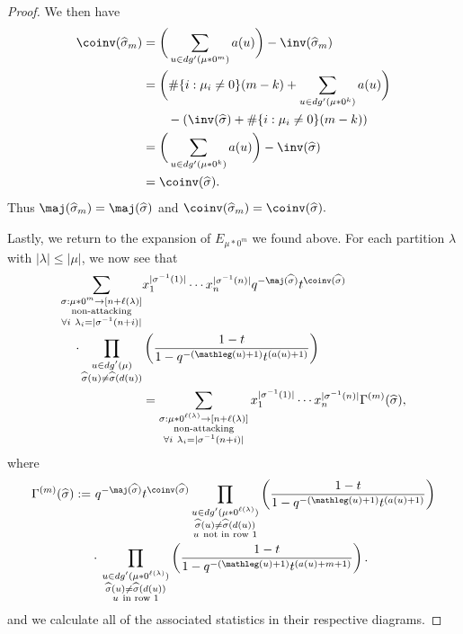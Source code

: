 \begin{proof}
We then have 
\begin{align*}
    \coinv(\widehat{\sigma}_m)&= \bigg( \sum_{u \in dg'(\mu * 0^m)} a(u) \bigg) - \inv(\widehat{\sigma}_m) \\
    &= \bigg(\#\{i:\mu_i \neq 0\}(m-k) + \sum_{u \in dg'(\mu*0^k)} a(u)\bigg) \\ & \qquad - \left( \inv(\widehat{\sigma}) + \#\{i:\mu_i \neq 0\}(m-k)\right)\\
    & = \bigg( \sum_{u \in dg'(\mu*0^k)} a(u)\bigg) - \inv(\widehat{\sigma}) \\
    &= \coinv(\widehat{\sigma}).
\end{align*}
  Thus $\maj(\widehat{\sigma}_m) = \maj(\widehat{\sigma})$ and $\coinv(\widehat{\sigma}_m)= \coinv(\widehat{\sigma}).$

Lastly, we return to the expansion of $E_{\mu*0^m}$ we found above. For each partition $\lambda$ with $|\lambda| \leq |\mu|$, we now see that 
\begin{align*}
     \sum_{\substack{\sigma:\mu* 0^m \rightarrow [n+\ell(\lambda)]\\ \text{non-attacking} \\ \forall i ~ \lambda_i = |\sigma^{-1}(n+i)|}} & x_1 ^{|\sigma^{-1}(1)|}\cdots x_n ^{|\sigma^{-1}(n)|} q^{-\maj(\widehat{\sigma})}t^{\coinv(\widehat{\sigma})} \\
      \cdot \prod_{\substack{u \in dg'(\mu) \\ \widehat{\sigma}(u) \neq \widehat{\sigma}(d(u))}} & \left( \frac{1-t}{1-q^{-(\mathleg(u)+1)}t^{(a(u)+1)}} \right) \\
     & = \sum_{\substack{\sigma:\mu* 0^{\ell(\lambda)} \rightarrow [n+\ell(\lambda)]\\ \text{non-attacking} \\ \forall i ~ \lambda_i = |\sigma^{-1}(n+i)|}} x_1 ^{|\sigma^{-1}(1)|}\cdots x_n ^{|\sigma^{-1}(n)|} \Gamma^{(m)}(\widehat{\sigma}),
\end{align*}
where
\begin{align*}
    \Gamma^{(m)}(\widehat{\sigma}) := &\ {} q^{-\maj(\widehat{\sigma})}t^{\coinv(\widehat{\sigma})} \prod_{\substack{ u \in dg'(\mu * 0^{\ell(\lambda)}) \\ \widehat{\sigma}(u) \neq \widehat{\sigma}(d(u)) \\ u ~ \text{not in row } 1 }} \left( \frac{1-t}{1-q^{-(\mathleg(u)+1)}t^{(a(u)+1)}} \right) \\
    & \cdot {} \prod_{\substack{ u \in dg'(\mu * 0^{\ell(\lambda)}) \\ \widehat{\sigma}(u) \neq \widehat{\sigma}(d(u)) \\ u ~ \text{in row } 1 }} \left( \frac{1-t}{1-q^{-(\mathleg(u) +1)}t^{(a(u) + m + 1)}} \right).
\end{align*}
and we calculate all of the associated statistics in their respective diagrams.
 \end{proof}

